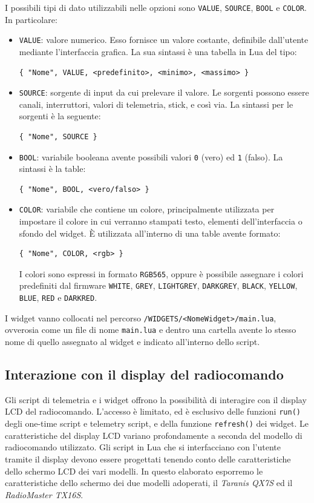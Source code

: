 \documentclass[a4paper, 12pt]{report} %
\begin{document}
I possibili tipi di dato utilizzabili nelle opzioni sono \texttt{VALUE}, \texttt{SOURCE}, \texttt{BOOL} e \texttt{COLOR}. In particolare:
\begin{itemize}
        \item \texttt{VALUE}: valore numerico. Esso fornisce un valore costante, definibile dall'utente mediante l'interfaccia grafica. La sua sintassi è una tabella in Lua del tipo:
\begin{lstlisting} 
{ "Nome", VALUE, <predefinito>, <minimo>, <massimo> }
\end{lstlisting}
        \item \texttt{SOURCE}: sorgente di input da cui prelevare il valore. Le sorgenti possono essere canali, interruttori, valori di telemetria, stick, e così via. La sintassi per le sorgenti è la seguente: 
\begin{lstlisting} 
{ "Nome", SOURCE } 
\end{lstlisting}
        \item \texttt{BOOL}: variabile booleana avente possibili valori \texttt{0} (vero) ed \texttt{1} (falso). La sintassi è la table:
\begin{lstlisting}
{ "Nome", BOOL, <vero/falso> }
\end{lstlisting}
        \item \texttt{COLOR}: variabile che contiene un colore, principalmente utilizzata per impostare il colore in cui verranno stampati testo, elementi dell'interfaccia o sfondo del widget. È utilizzata all'interno di una table avente formato:
\begin{lstlisting} 
{ "Nome", COLOR, <rgb> } 
\end{lstlisting} 
        I colori sono espressi in formato \texttt{RGB565}, oppure è possibile assegnare i colori predefiniti dal firmware \texttt{WHITE}, \texttt{GREY}, \texttt{LIGHTGREY}, \texttt{DARKGREY}, \texttt{BLACK}, \texttt{YELLOW}, \texttt{BLUE}, \texttt{RED} e \texttt{DARKRED}.
\end{itemize}

I widget vanno collocati nel percorso \texttt{/WIDGETS/<NomeWidget>/main.lua}, ovverosia come un file di nome \texttt{main.lua} e dentro una cartella avente lo stesso nome di quello assegnato al widget e indicato all'interno dello script.

\subsection{Interazione con il display del radiocomando}
Gli script di telemetria e i widget offrono la possibilità di interagire con il display LCD del radiocomando. L'accesso è limitato, ed è esclusivo delle funzioni \texttt{run()} degli one-time script e telemetry script, e della funzione \texttt{refresh()} dei widget.
Le caratteristiche del display LCD variano profondamente a seconda del modello di radiocomando utilizzato. Gli script in Lua che si interfacciano con l'utente tramite il display devono essere progettati tenendo conto delle caratteristiche dello schermo LCD dei vari modelli. In questo elaborato esporremo le caratteristiche dello schermo dei due modelli adoperati, il \emph{Taranis QX7S} ed il \emph{RadioMaster TX16S}. 
\end{document}
